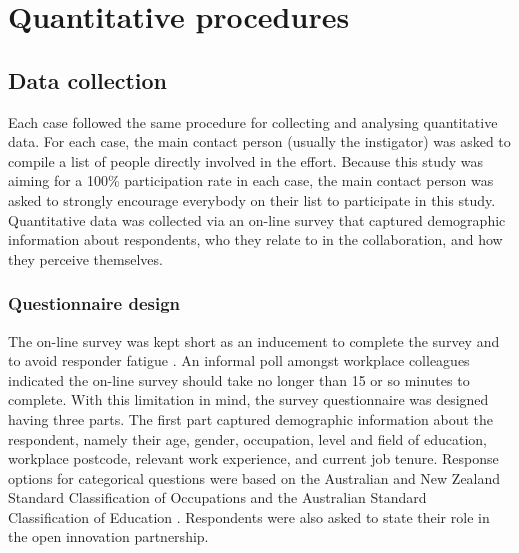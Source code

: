 \section{Quantitative procedures}

\subsection{Data collection}

Each case followed the same procedure for collecting and analysing quantitative data. For each case, the main contact person (usually the instigator) was asked to compile a list of people directly involved in the effort. Because this study was aiming for a 100\% participation rate in each case, the main contact person was asked to strongly encourage everybody on their list to participate in this study. Quantitative data was collected via an on-line survey that captured demographic information about respondents, who they relate to in the collaboration, and how they perceive themselves.\medskip

\subsubsection{Questionnaire design}

The on-line survey was kept short as an inducement to complete the survey and to avoid responder fatigue \citep{crawford2001web,van2006conducting}. An informal poll amongst workplace colleagues indicated the on-line survey should take no longer than 15 or so minutes to complete. With this limitation in mind, the survey questionnaire was designed having three parts. The first part captured demographic information about the respondent, namely their age, gender, occupation, level and field of education, workplace postcode, relevant work experience, and current job tenure. Response options for categorical questions were based on the Australian and New Zealand Standard Classification of Occupations \citep{pink2009anzsco} and the Australian Standard Classification of Education \citep{trewin2000australian}. Respondents were also asked to state their role in the open innovation partnership.\medskip

